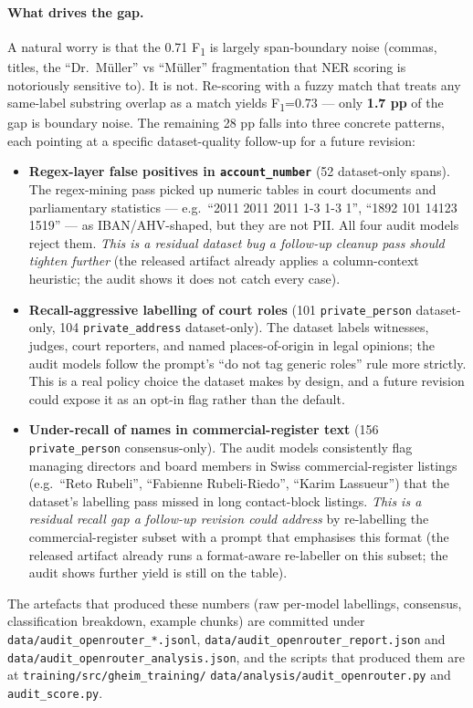 \documentclass[sigconf,nonacm]{acmart}
\begin{document}
\paragraph{What drives the gap.} A natural worry is that the 0.71
F\textsubscript{1} is largely span-boundary noise (commas, titles,
the ``Dr.\ Müller'' vs ``Müller'' fragmentation that NER scoring is
notoriously sensitive to). It is not. Re-scoring with a fuzzy
match that treats any same-label substring overlap as a match
yields F\textsubscript{1}=0.73 --- only \textbf{1.7 pp} of the gap
is boundary noise. The remaining 28 pp falls into three concrete
patterns, each pointing at a specific dataset-quality follow-up
for a future revision:
\begin{itemize}
  \item \textbf{Regex-layer false positives in
        \texttt{account\_number}} (52 dataset-only spans). The
        regex-mining pass picked up numeric tables in court
        documents and parliamentary statistics --- e.g.\
        ``2011 2011 2011 1-3 1-3 1'', ``1892 101 14123 1519'' ---
        as IBAN/AHV-shaped, but they are not PII. All four audit
        models reject them. \emph{This is a residual dataset bug a
        follow-up cleanup pass should tighten further} (the released
        artifact already applies a column-context heuristic; the
        audit shows it does not catch every case).
  \item \textbf{Recall-aggressive labelling of court roles}
        (101 \texttt{private\_person} dataset-only,
        104 \texttt{private\_address} dataset-only). The dataset
        labels witnesses, judges, court reporters, and named
        places-of-origin in legal opinions; the audit models
        follow the prompt's ``do not tag generic roles'' rule
        more strictly. This is a real policy choice the dataset
        makes by design, and a future revision could expose it as
        an opt-in flag rather than the default.
  \item \textbf{Under-recall of names in commercial-register
        text} (156 \texttt{private\_person} consensus-only). The
        audit models consistently flag managing directors and
        board members in Swiss commercial-register listings
        (e.g.\ ``Reto Rubeli'', ``Fabienne Rubeli-Riedo'',
        ``Karim Lassueur'') that the dataset's labelling pass
        missed in long contact-block listings. \emph{This is a
        residual recall gap a follow-up revision could address} by
        re-labelling the commercial-register subset with a prompt
        that emphasises this format (the released artifact already
        runs a format-aware re-labeller on this subset; the audit
        shows further yield is still on the table).
\end{itemize}
The artefacts that produced these numbers (raw per-model
labellings, consensus, classification breakdown, example chunks)
are committed under \texttt{data/audit\_openrouter\_*.jsonl},
\texttt{data/audit\_openrouter\_report.json} and
\texttt{data/audit\_openrouter\_analysis.json}, and the scripts
that produced them are at \texttt{training/src/gheim\_training/}
\texttt{data/analysis/audit\_openrouter.py} and
\texttt{audit\_score.py}.
\end{document}
